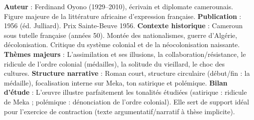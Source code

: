 \documentclass[11pt]{article}
\begin{document}
\begin{savaistu}
\textbf{Auteur} : Ferdinand Oyono (1929--2010), écrivain et diplomate camerounais. Figure majeure de la littérature africaine d'expression française.
\textbf{Publication} : 1956 (éd. Julliard). Prix Sainte-Beuve 1956.
\textbf{Contexte historique} : Cameroun sous tutelle française (années 50). Montée des nationalismes, guerre d'Algérie, décolonisation. Critique du système colonial et de la néocolonisation naissante.
\textbf{Thèmes majeurs} : L'assimilation et ses illusions, la collaboration/résistance, le ridicule de l'ordre colonial (médailles), la solitude du vieillard, le choc des cultures.
\textbf{Structure narrative} : Roman court, structure circulaire (début/fin : la médaille), focalisation interne sur Meka, ton satirique et polémique.
\textbf{Bilan d'étude} : L'œuvre illustre parfaitement les tonalités étudiées (satirique : ridicule de Meka ; polémique : dénonciation de l'ordre colonial). Elle sert de support idéal pour l'exercice de contraction (texte argumentatif/narratif à thèse implicite).
\end{savaistu}
\end{document}
